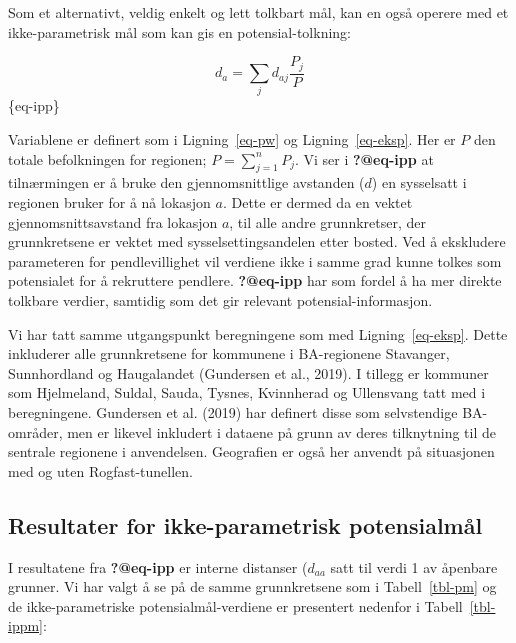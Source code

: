 \documentclass[
]{article}
\begin{document}
Som et alternativt, veldig enkelt og lett tolkbart mål, kan en også
operere med et ikke-parametrisk mål som kan gis en potensial-tolkning:

\[
d_a = \sum_j d_{aj} \frac{P_j}{P}
\] \{eq-ipp\}

Variablene er definert som i Ligning~\ref{eq-pw} og
Ligning~\ref{eq-eksp}. Her er \(P\) den totale befolkningen for
regionen; \(P = \sum^n_{j = 1} P_j\). Vi ser i \textbf{?@eq-ipp} at
tilnærmingen er å bruke den gjennomsnittlige avstanden (\(d\)) en
sysselsatt i regionen bruker for å nå lokasjon \(a\). Dette er dermed da
en vektet gjennomsnittsavstand fra lokasjon \(a\), til alle andre
grunnkretser, der grunnkretsene er vektet med sysselsettingsandelen
etter bosted. Ved å ekskludere parameteren for pendlevillighet vil
verdiene ikke i samme grad kunne tolkes som potensialet for å rekruttere
pendlere. \textbf{?@eq-ipp} har som fordel å ha mer direkte tolkbare
verdier, samtidig som det gir relevant potensial-informasjon.

Vi har tatt samme utgangspunkt beregningene som med
Ligning~\ref{eq-eksp}. Dette inkluderer alle grunnkretsene for kommunene
i BA-regionene Stavanger, Sunnhordland og Haugalandet (Gundersen et al.,
2019). I tillegg er kommuner som Hjelmeland, Suldal, Sauda, Tysnes,
Kvinnherad og Ullensvang tatt med i beregningene. Gundersen et al.
(2019) har definert disse som selvstendige BA-områder, men er likevel
inkludert i dataene på grunn av deres tilknytning til de sentrale
regionene i anvendelsen. Geografien er også her anvendt på situasjonen
med og uten Rogfast-tunellen.

\hypertarget{resultater-for-ikke-parametrisk-potensialmuxe5l}{%
\subsection{Resultater for ikke-parametrisk
potensialmål}\label{resultater-for-ikke-parametrisk-potensialmuxe5l}}

I resultatene fra \textbf{?@eq-ipp} er interne distanser (\(d_{aa}\)
satt til verdi 1 av åpenbare grunner. Vi har valgt å se på de samme
grunnkretsene som i Tabell~\ref{tbl-pm} og de ikke-parametriske
potensialmål-verdiene er presentert nedenfor i Tabell~\ref{tbl-ippm}:
\end{document}

